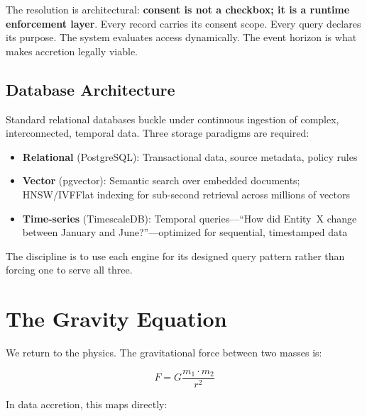 \documentclass[11pt,twocolumn]{article}
\begin{document}
The resolution is architectural: \textbf{consent is not a checkbox; it is a runtime enforcement layer}. Every record carries its consent scope. Every query declares its purpose. The system evaluates access dynamically. The event horizon is what makes accretion legally viable.

\subsection{Database Architecture}

Standard relational databases buckle under continuous ingestion of complex, interconnected, temporal data. Three storage paradigms are required:

\begin{itemize}[nosep,leftmargin=1.2em]
  \item \textbf{Relational} (PostgreSQL): Transactional data, source metadata, policy rules
  \item \textbf{Vector} (pgvector): Semantic search over embedded documents; HNSW/IVFFlat indexing for sub-second retrieval across millions of vectors
  \item \textbf{Time-series} (TimescaleDB): Temporal queries---``How did Entity~X change between January and June?''---optimized for sequential, timestamped data
\end{itemize}

The discipline is to use each engine for its designed query pattern rather than forcing one to serve all three.

\section{The Gravity Equation}

We return to the physics. The gravitational force between two masses is:

\begin{equation}
F = G \frac{m_1 \cdot m_2}{r^2}
\label{eq:gravity}
\end{equation}

In data accretion, this maps directly:
\end{document}
